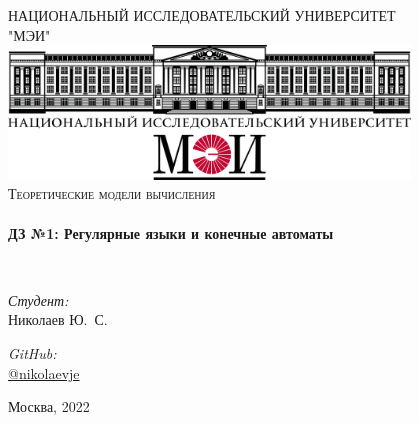 \begin{titlepage}
\begin{center}



\textsc{\Large НАЦИОНАЛЬНЫЙ ИССЛЕДОВАТЕЛЬСКИЙ УНИВЕРСИТЕТ}\\
\textsc{\Large "МЭИ"}\\[1cm]

\includegraphics[width=0.8\textwidth]{img/logo.png}~\\[1cm]

\textsc{\Large Теоретические модели вычисления}\\[0.5cm]

\HRule \\[0.4cm]
{ \LARGE \bfseries ДЗ №1: Регулярные языки и конечные автоматы \\[0.4cm] }

\HRule \\[1.5cm]

\noindent
\begin{minipage}{0.4\textwidth}
\begin{flushleft} \large
\emph{Студент:}\\
Николаев \textsc{Ю.~С.}
\end{flushleft}
\end{minipage}%
\begin{minipage}{0.4\textwidth}
\begin{flushright} \large
\emph{GitHub:} \\
\href{https://github.com/NRU-MPEI-IMAI/regular-languages-and-finite-machines-nikolaevje}{@nikolaevje}
\end{flushright}
\end{minipage}

\vfill

{\large Москва, 2022}

\end{center}
\end{titlepage}